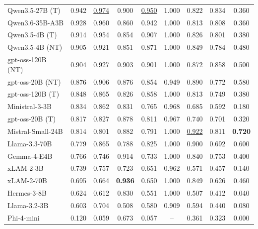 \begin{table}[t]
\begin{tabular}{l ccccc ccc}
Qwen3.5-27B (T) & 0.942 & \underline{0.974} & 0.900 & \underline{0.950} & 1.000 & 0.822 & 0.834 & 0.360 \\
Qwen3.6-35B-A3B & 0.928 & 0.960 & 0.860 & 0.942 & 1.000 & 0.813 & 0.808 & 0.360 \\
Qwen3.5-4B (T) & 0.914 & 0.954 & 0.854 & 0.907 & 1.000 & 0.826 & 0.801 & 0.380 \\
Qwen3.5-4B (NT) & 0.905 & 0.921 & 0.851 & 0.871 & 1.000 & 0.849 & 0.784 & 0.480 \\
gpt-oss-120B (NT) & 0.904 & 0.927 & 0.903 & 0.901 & 1.000 & 0.872 & 0.858 & 0.500 \\
gpt-oss-20B (NT) & 0.876 & 0.906 & 0.876 & 0.854 & 0.949 & 0.890 & 0.772 & 0.580 \\
gpt-oss-120B (T) & 0.848 & 0.865 & 0.826 & 0.858 & 1.000 & 0.813 & 0.749 & 0.380 \\
Ministral-3-3B & 0.834 & 0.862 & 0.831 & 0.765 & 0.968 & 0.685 & 0.592 & 0.180 \\
gpt-oss-20B (T) & 0.817 & 0.827 & 0.878 & 0.811 & 0.967 & 0.740 & 0.701 & 0.320 \\
Mistral-Small-24B & 0.814 & 0.801 & 0.882 & 0.791 & 1.000 & \underline{0.922} & 0.811 & \textbf{0.720} \\
Llama-3.3-70B & 0.779 & 0.865 & 0.788 & 0.825 & 1.000 & 0.900 & 0.692 & 0.600 \\
Gemma-4-E4B & 0.766 & 0.746 & 0.914 & 0.733 & 1.000 & 0.840 & 0.753 & 0.400 \\
xLAM-2-3B & 0.739 & 0.757 & 0.723 & 0.651 & 0.962 & 0.571 & 0.457 & 0.140 \\
xLAM-2-70B & 0.695 & 0.664 & \textbf{0.936} & 0.650 & 1.000 & 0.849 & 0.626 & 0.460 \\
Hermes-3-8B & 0.624 & 0.612 & 0.830 & 0.551 & 1.000 & 0.507 & 0.412 & 0.040 \\
Llama-3.2-3B & 0.603 & 0.704 & 0.508 & 0.580 & 0.909 & 0.594 & 0.440 & 0.080 \\
Phi-4-mini & 0.120 & 0.059 & 0.673 & 0.057 & -- & 0.361 & 0.323 & 0.000 \\
\bottomrule
\end{tabular}

\end{table}
